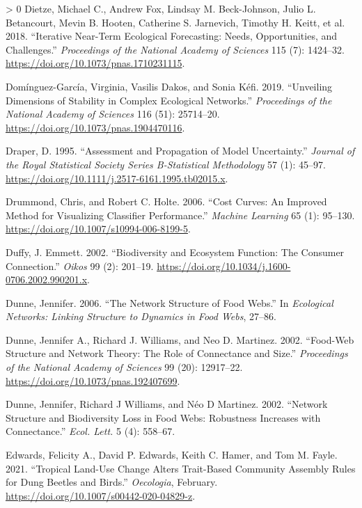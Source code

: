\documentclass[11pt]{article}
\newlength{\cslhangindent}
\newenvironment{CSLReferences}[3] %
 {%
  \setlength{\parindent}{0pt}
  \ifodd #1 \everypar{\setlength{\hangindent}{\cslhangindent}}\ignorespaces\fi
  \ifnum #2 > 0
  \setlength{\parskip}{#2\baselineskip}
  \fi
 }%
 {}
\begin{document}
\begin{CSLReferences}{1}{0}
\leavevmode\hypertarget{ref-Dietze2018IteNea}{}%
Dietze, Michael C., Andrew Fox, Lindsay M. Beck-Johnson, Julio L.
Betancourt, Mevin B. Hooten, Catherine S. Jarnevich, Timothy H. Keitt,
et al. 2018. {``Iterative Near-Term Ecological Forecasting: Needs,
Opportunities, and Challenges.''} \emph{Proceedings of the National
Academy of Sciences} 115 (7): 1424--32.
\url{https://doi.org/10.1073/pnas.1710231115}.

\leavevmode\hypertarget{ref-Dominguez-Garcia2019UnvDim}{}%
Domínguez-García, Virginia, Vasilis Dakos, and Sonia Kéfi. 2019.
{``Unveiling Dimensions of Stability in Complex Ecological Networks.''}
\emph{Proceedings of the National Academy of Sciences} 116 (51):
25714--20. \url{https://doi.org/10.1073/pnas.1904470116}.

\leavevmode\hypertarget{ref-Draper1995AssPro}{}%
Draper, D. 1995. {``Assessment and Propagation of Model Uncertainty.''}
\emph{Journal of the Royal Statistical Society Series B-Statistical
Methodology} 57 (1): 45--97.
\url{https://doi.org/10.1111/j.2517-6161.1995.tb02015.x}.

\leavevmode\hypertarget{ref-Drummond2006CosCur}{}%
Drummond, Chris, and Robert C. Holte. 2006. {``Cost Curves: An Improved
Method for Visualizing Classifier Performance.''} \emph{Machine
Learning} 65 (1): 95--130.
\url{https://doi.org/10.1007/s10994-006-8199-5}.

\leavevmode\hypertarget{ref-Duffy2002BioEco}{}%
Duffy, J. Emmett. 2002. {``Biodiversity and Ecosystem Function: The
Consumer Connection.''} \emph{Oikos} 99 (2): 201--19.
\url{https://doi.org/10.1034/j.1600-0706.2002.990201.x}.

\leavevmode\hypertarget{ref-Dunne2006NetStr}{}%
Dunne, Jennifer. 2006. {``The Network Structure of Food Webs.''} In
\emph{Ecological Networks: Linking Structure to Dynamics in Food Webs},
27--86.

\leavevmode\hypertarget{ref-Dunne2002FooStr}{}%
Dunne, Jennifer A., Richard J. Williams, and Neo D. Martinez. 2002.
{``Food-Web Structure and Network Theory: The Role of Connectance and
Size.''} \emph{Proceedings of the National Academy of Sciences} 99 (20):
12917--22. \url{https://doi.org/10.1073/pnas.192407699}.

\leavevmode\hypertarget{ref-Dunne2002NetStr}{}%
Dunne, Jennifer, Richard J Williams, and Néo D Martinez. 2002.
{``Network Structure and Biodiversity Loss in Food Webs: Robustness
Increases with Connectance.''} \emph{Ecol. Lett.} 5 (4): 558--67.

\leavevmode\hypertarget{ref-Edwards2021TroLan}{}%
Edwards, Felicity A., David P. Edwards, Keith C. Hamer, and Tom M.
Fayle. 2021. {``Tropical Land-Use Change Alters Trait-Based Community
Assembly Rules for Dung Beetles and Birds.''} \emph{Oecologia},
February. \url{https://doi.org/10.1007/s00442-020-04829-z}.


\end{CSLReferences}
\end{document}

